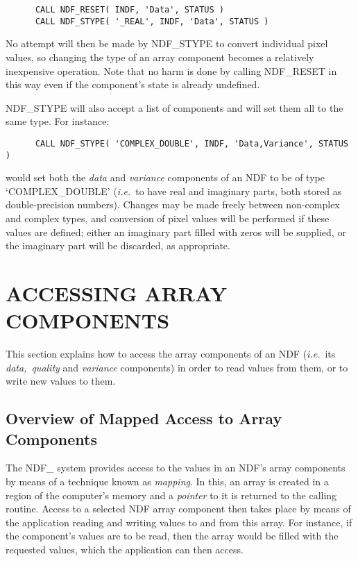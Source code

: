 \documentclass[twoside,11pt]{article}
\newcommand{\xlabel}[1]{}
\newcommand{\st}[1]{{\em{#1}}}
\begin{document}
\small
\begin{verbatim}
      CALL NDF_RESET( INDF, 'Data', STATUS )
      CALL NDF_STYPE( '_REAL', INDF, 'Data', STATUS )
\end{verbatim}      
\normalsize

No attempt will then be made by NDF\_STYPE to convert individual pixel values,
so changing the type of an array component becomes a relatively inexpensive
operation.
Note that no harm is done by calling NDF\_RESET in this way even if the
component's state is already undefined. 

NDF\_STYPE will also accept a list of components and will set them all to 
the same type.
For instance:

\small
\begin{verbatim}
      CALL NDF_STYPE( 'COMPLEX_DOUBLE', INDF, 'Data,Variance', STATUS )
\end{verbatim}
\normalsize

would set both the \st{data\/} and \st{variance\/} components of an NDF to be
of type `COMPLEX\_DOUBLE' (\st{i.e.}\ to have real and imaginary parts, both
stored as double-precision numbers). 
Changes may be made freely between non-complex and complex types, and
conversion of pixel values will be performed if these values are defined;
either an imaginary part filled with zeros will be supplied, or the
imaginary part will be discarded, as appropriate. 


\section{\xlabel{accessing_array_components}\label{ss:accessingarraycomponents}ACCESSING ARRAY COMPONENTS}

This section explains how to access the array components of an NDF
(\st{i.e.}\ its \st{data,}\ \st{quality\/} and \st{variance\/}
components) in  
order to read values from them, or to write new values to them.

\subsection{\xlabel{overview_of_mapped_access_to_array_components}Overview of Mapped Access to Array Components}

The NDF\_ system provides access to the values in an NDF's array
components by means of a technique known as \st{mapping}.  In this,
an array is created in a region of the computer's memory and a
\st{pointer\/} to it is returned to the calling routine.  Access to a 
selected NDF array component then takes place by means of the
application reading and writing values to and from this array.  For
instance, if the component's values are to be read, then the array
would be filled with the requested values, which the application can
then access.
\end{document}
